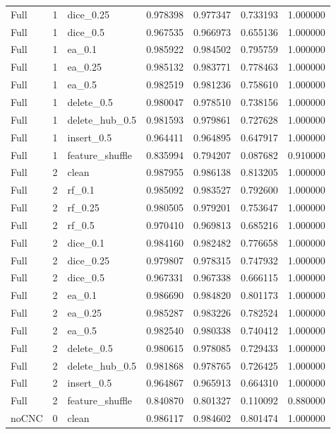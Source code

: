 \documentclass[UTF8,a4paper,11pt,fontset=fandol]{ctexart}
\begin{document}
{\begin{longtable}{lrlrrrr}
Full & 1 & dice\_0.25 & 0.978398 & 0.977347 & 0.733193 & 1.000000 \\
Full & 1 & dice\_0.5 & 0.967535 & 0.966973 & 0.655136 & 1.000000 \\
Full & 1 & ea\_0.1 & 0.985922 & 0.984502 & 0.795759 & 1.000000 \\
Full & 1 & ea\_0.25 & 0.985132 & 0.983771 & 0.778463 & 1.000000 \\
Full & 1 & ea\_0.5 & 0.982519 & 0.981236 & 0.758610 & 1.000000 \\
Full & 1 & delete\_0.5 & 0.980047 & 0.978510 & 0.738156 & 1.000000 \\
Full & 1 & delete\_hub\_0.5 & 0.981593 & 0.979861 & 0.727628 & 1.000000 \\
Full & 1 & insert\_0.5 & 0.964411 & 0.964895 & 0.647917 & 1.000000 \\
Full & 1 & feature\_shuffle & 0.835994 & 0.794207 & 0.087682 & 0.910000 \\
Full & 2 & clean & 0.987955 & 0.986138 & 0.813205 & 1.000000 \\
Full & 2 & rf\_0.1 & 0.985092 & 0.983527 & 0.792600 & 1.000000 \\
Full & 2 & rf\_0.25 & 0.980505 & 0.979201 & 0.753647 & 1.000000 \\
Full & 2 & rf\_0.5 & 0.970410 & 0.969813 & 0.685216 & 1.000000 \\
Full & 2 & dice\_0.1 & 0.984160 & 0.982482 & 0.776658 & 1.000000 \\
Full & 2 & dice\_0.25 & 0.979807 & 0.978315 & 0.747932 & 1.000000 \\
Full & 2 & dice\_0.5 & 0.967331 & 0.967338 & 0.666115 & 1.000000 \\
Full & 2 & ea\_0.1 & 0.986690 & 0.984820 & 0.801173 & 1.000000 \\
Full & 2 & ea\_0.25 & 0.985287 & 0.983226 & 0.782524 & 1.000000 \\
Full & 2 & ea\_0.5 & 0.982540 & 0.980338 & 0.740412 & 1.000000 \\
Full & 2 & delete\_0.5 & 0.980615 & 0.978085 & 0.729433 & 1.000000 \\
Full & 2 & delete\_hub\_0.5 & 0.981868 & 0.978765 & 0.726425 & 1.000000 \\
Full & 2 & insert\_0.5 & 0.964867 & 0.965913 & 0.664310 & 1.000000 \\
Full & 2 & feature\_shuffle & 0.840870 & 0.801327 & 0.110092 & 0.880000 \\
noCNC & 0 & clean & 0.986117 & 0.984602 & 0.801474 & 1.000000 \\

\end{longtable}}
\end{document}
